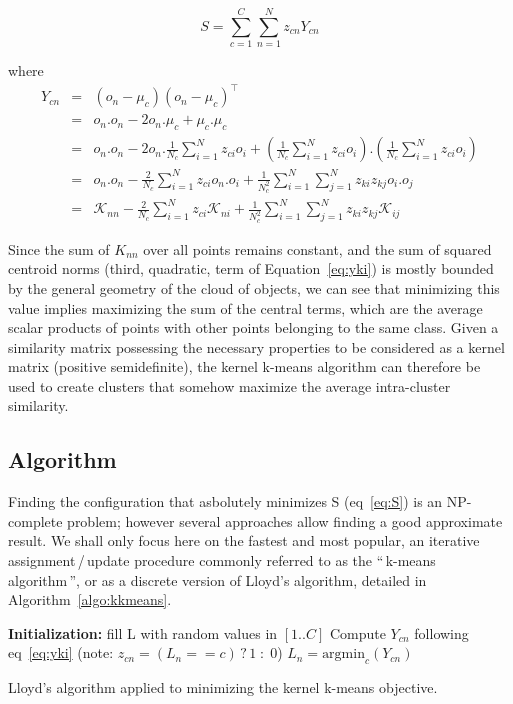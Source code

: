 \documentclass[a4paper,twoside]{article}
\newcommand{\gl}[1]{``\,#1\,''} %
\begin{document}
\[
S = \sum_{c=1}^{C} \sum_{n=1}^{N} z_{cn} Y_{cn}
\]

where
\begin{eqnarray}
Y_{cn} & = & \left(o_n-\mu_c\right)\left(o_n-\mu_c\right)^\top \\
       & = & o_n.o_n - 2 o_n.\mu_c + \mu_c.\mu_c \\
       & = & o_n.o_n - 2 o_n.\frac{1}{N_c} \sum_{i=1}^{N} z_{ci} o_i +
       	 \left(\frac{1}{N_c} \sum_{i=1}^{N} z_{ci} o_i\right).\left(\frac{1}{N_c} \sum_{i=1}^{N} z_{ci} o_i\right) \\
       & = & o_n.o_n - \frac{2}{N_c} \sum_{i=1}^{N} z_{ci} o_n.o_i +
       	 \frac{1}{N_c^2} \sum_{i=1}^{N} \sum_{j=1}^{N} z_{ki} z_{kj} o_i.o_j \\
       & = & \mathcal{K}_{nn} - \frac{2}{N_c} \sum_{i=1}^{N} z_{ci} \mathcal{K}_{ni} +
         \frac{1}{N_c^2} \sum_{i=1}^{N} \sum_{j=1}^{N} z_{ki} z_{kj} \mathcal{K}_{ij} \label{eq:yki}
\end{eqnarray}

Since the sum of $K_{nn}$ over all points remains constant, and the sum of squared centroid norms (third, quadratic, term of Equation~\ref{eq:yki}) is mostly bounded by the general geometry of the cloud of objects, we can see that minimizing this value implies maximizing the sum of the central terms, which are the average scalar products of points with other points belonging to the same class. Given a similarity matrix possessing the necessary properties to be considered as a kernel matrix (positive semidefinite), the kernel k-means algorithm can therefore be used to create clusters that somehow maximize the average intra-cluster similarity.

\subsection{Algorithm}

Finding the configuration that asbolutely minimizes S (eq~\ref{eq:S}) is an NP-complete problem; however several approaches allow finding a good approximate result. We shall only focus here on the fastest and most popular, an iterative assignment\,/\,update procedure commonly referred to as the \gl{k-means algorithm}, or as a discrete version of Lloyd's algorithm, detailed in Algorithm~\ref{algo:kkmeans}.

\begin{algorithm}
	\label{algo:kkmeans}
	\SetAlgoLined
	\BlankLine	
	\textbf{Initialization:} fill L with random values in $[1..C]$\;
	\BlankLine	
	 {
		 {
			 {
				Compute $Y_{cn}$ following eq~\ref{eq:yki} \label{algline:kkmeans_cplx1}
				(note: $z_{cn} = (L_n == c)\,?\,1\;:\;0$)
			}
			$L_n = \textrm{argmin}_c (Y_{cn})$\;
		}
	}
	\BlankLine
	\caption{Lloyd's algorithm applied to minimizing the kernel k-means objective.}
\end{algorithm}
\end{document}
